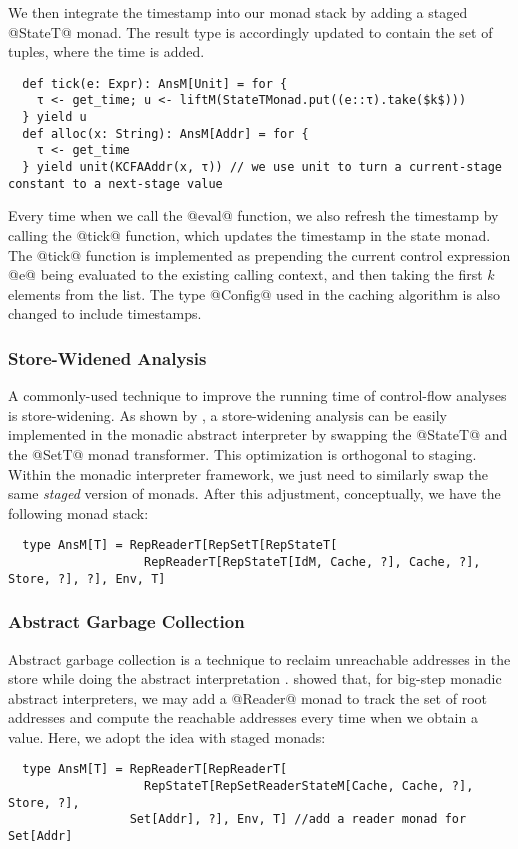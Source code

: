 We then integrate the timestamp into our monad stack by adding a staged
@StateT@ monad. The result type is accordingly updated to contain the set of
tuples, where the time is added.
\begin{lstlisting}
  def tick(e: Expr): AnsM[Unit] = for {
    τ <- get_time; u <- liftM(StateTMonad.put((e::τ).take($k$)))
  } yield u
  def alloc(x: String): AnsM[Addr] = for {
    τ <- get_time
  } yield unit(KCFAAddr(x, τ)) // we use unit to turn a current-stage constant to a next-stage value
\end{lstlisting}

Every time when we call the @eval@ function, we also refresh the timestamp by
calling the @tick@ function, which updates the timestamp in the state monad.
The @tick@ function is implemented as prepending the current control expression
@e@ being evaluated to the existing calling context, and then taking the first
$k$ elements from the list. The type @Config@ used in the caching algorithm is
also changed to include timestamps.

\subsubsection{Store-Widened Analysis}

A commonly-used technique to improve the running time of control-flow analyses
is store-widening. As shown by \cite{Darais:2015:GTM:2814270.2814308,
DBLP:journals/pacmpl/DaraisLNH17}, a store-widening analysis can be easily
implemented in the monadic abstract interpreter by swapping the @StateT@ and
the @SetT@ monad transformer. This optimization is orthogonal to staging.
Within the monadic interpreter framework, we just need to similarly swap the
same \textit{staged} version of monads. After this adjustment, conceptually, we
have the following monad stack:
\begin{lstlisting}
  type AnsM[T] = RepReaderT[RepSetT[RepStateT[
                   RepReaderT[RepStateT[IdM, Cache, ?], Cache, ?], Store, ?], ?], Env, T]
\end{lstlisting}

\subsubsection{Abstract Garbage Collection}

Abstract garbage collection is a technique to reclaim unreachable addresses in
the store while doing the abstract interpretation
\cite{Might:2006:IFA:1159803.1159807}. \citet{DBLP:journals/pacmpl/DaraisLNH17}
showed that, for big-step monadic abstract interpreters, we may add a @Reader@
monad to track the set of root addresses and compute the reachable addresses every
time when we obtain a value. Here, we adopt the idea with staged monads:
\begin{lstlisting}
  type AnsM[T] = RepReaderT[RepReaderT[
                   RepStateT[RepSetReaderStateM[Cache, Cache, ?], Store, ?],
                 Set[Addr], ?], Env, T] //add a reader monad for Set[Addr]
\end{lstlisting}

